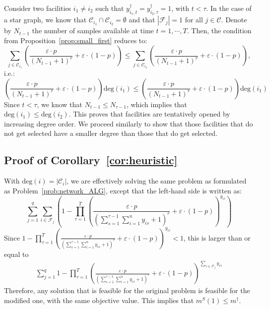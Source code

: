 \documentclass[nonblindrev]{informs3noheader}
\def\calC{\mathcal{C}}
\def\calF{\mathcal{F}}
\begin{document}
Consider two facilities $i_1\neq i_2$ such that $y^\dagger_{i_1,t}=y^\dagger_{i_2, \tau}=1$, with $t<\tau$. In the case of a star graph, we know that $\calC_{i_1}\cap\calC_{i_2}=\emptyset$ and that $|\calF_j|=1$ for all $j\in\calC$. Denote by $N_{t-1}$ the number of samples available at time $t=1,\cdots,T$. Then, the condition from Proposition~\ref{prop:small_first} reduces to:
$$\sum_{j \in \calC_{i_1}}\left(\frac{\varepsilon\cdot p}{\left(N_{t-1} +1\right)^r}+\varepsilon\cdot(1-p)\right)\leq\sum_{j \in \calC_{i_2}}\left(\frac{\varepsilon\cdot p}{\left(N_{t-1} +1\right)^r}+\varepsilon\cdot(1-p)\right),$$
i.e.:
$$\left(\frac{\varepsilon\cdot p}{\left(N_{t-1} +1\right)^r}+\varepsilon\cdot(1-p)\right)\text{deg}(i_1)\leq\left(\frac{\varepsilon\cdot p}{\left(N_{t-1} +1\right)^r}+\varepsilon\cdot(1-p)\right)\text{deg}(i_1)$$
Since $t<\tau$, we know that $N_{t-1}\leq N_{\tau-1}$, which implies that $\text{deg}(i_1)\leq\text{deg}(i_2)$. This proves that facilities are tentatively opened by increasing degree order. We proceed similarly to show that those facilities that do not get selected have a smaller degree than those that do get selected.
\hfill\Halmos

\subsection{Proof of Corollary~\ref{cor:heuristic}}

With $\text{deg}(i)=|\calC_i|$, we are effectively solving the same problem as formulated as Problem~\eqref{prob:network_ALG}, except that the left-hand side is written as:
\[\sum_{j=1}^q \sum_{i \in \calF_j} \left(1-\prod_{\tau=1}^T \left(\frac{\varepsilon\cdot p }{\left(\sum_{s=1}^{\tau-1} \sum_{i=1}^n y_{is} +1\right)^r}+\varepsilon\cdot(1-p)\right)^{y_{i\tau}}\right)\]
Since $1-\prod_{\tau=1}^T \left(\frac{\varepsilon\cdot p }{\left(\sum_{s=1}^{\tau-1} \sum_{i=1}^n y_{is} +1\right)^r}+\varepsilon\cdot(1-p)\right)^{y_{i\tau}}<1$, this is larger than or equal to
\begin{align*}
    \sum_{j=1}^q 1-\prod_{\tau=1}^T \left(\frac{\varepsilon\cdot p }{\left(\sum_{s=1}^{\tau-1} \sum_{i=1}^n y_{is} +1\right)^r}+\varepsilon\cdot(1-p)\right)^{\sum_{i \in \calF_j} y_{i\tau}}  
\end{align*}
Therefore, any solution that is feasible for the original problem is feasible for the modified one, with the same objective value. This implies that $m^S(1)\leq m^\dagger$.
\end{document}
